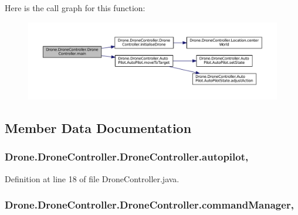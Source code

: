 Here is the call graph for this function\+:\nopagebreak
\begin{figure}[H]
\begin{center}
\leavevmode
\includegraphics[width=350pt]{class_drone_1_1_drone_controller_1_1_drone_controller_ac7542dd428ccd58fcb2431e4b8db9dc4_cgraph}
\end{center}
\end{figure}




\subsection{Member Data Documentation}
\hypertarget{class_drone_1_1_drone_controller_1_1_drone_controller_a8f81e6d1804ad7229a8f272c95d7a12a}{}
\subsubsection[{autopilot}]{ Drone.\+Drone\+Controller.\+Drone\+Controller.\+autopilot\hspace{0.3cm}{\ttfamily [static]}, {\ttfamily [private]}}\label{class_drone_1_1_drone_controller_1_1_drone_controller_a8f81e6d1804ad7229a8f272c95d7a12a}


Definition at line 18 of file Drone\+Controller.\+java.

\hypertarget{class_drone_1_1_drone_controller_1_1_drone_controller_a0e5212312dbbb3e38165eb7827973575}{}
\subsubsection[{command\+Manager}]{ Drone.\+Drone\+Controller.\+Drone\+Controller.\+command\+Manager\hspace{0.3cm}{\ttfamily [static]}, {\ttfamily [private]}}\label{class_drone_1_1_drone_controller_1_1_drone_controller_a0e5212312dbbb3e38165eb7827973575}


